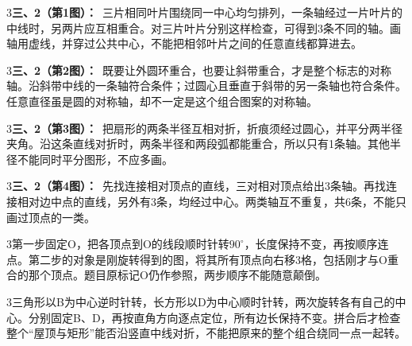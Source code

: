 \documentclass[multi=snippet,border={5bp 20bp 5bp 5bp}]{standalone}
\newenvironment{snippet}[3]{\begin{minipage}{#1bp}\color{answerred}\fontsize{#2}{#3}\selectfont\raggedright}{\end{minipage}}
\begin{document}
\begin{snippet}{505}{11.5}{14}\begin{multicols}{3}\raggedcolumns \textbf{三、2（第1图）：}\ 三片相同叶片围绕同一中心均匀排列，一条轴经过一片叶片的中线时，另两片应互相重合。对三片叶片分别这样检查，可得到3条不同的轴。画轴用虚线，并穿过公共中心，不能把相邻叶片之间的任意直线都算进去。\end{multicols}\end{snippet}
\begin{snippet}{505}{11.5}{14}\begin{multicols}{3}\raggedcolumns \textbf{三、2（第2图）：}\ 既要让外圆环重合，也要让斜带重合，才是整个标志的对称轴。沿斜带中线的一条轴符合条件；过圆心且垂直于斜带的另一条轴也符合条件。任意直径虽是圆的对称轴，却不一定是这个组合图案的对称轴。\end{multicols}\end{snippet}
\begin{snippet}{505}{11.5}{14}\begin{multicols}{3}\raggedcolumns \textbf{三、2（第3图）：}\ 把扇形的两条半径互相对折，折痕须经过圆心，并平分两半径夹角。沿这条直线对折时，两条半径和两段弧都能重合，所以只有1条轴。其他半径不能同时平分图形，不应多画。\end{multicols}\end{snippet}
\begin{snippet}{505}{11.5}{14}\begin{multicols}{3}\raggedcolumns \textbf{三、2（第4图）：}\ 先找连接相对顶点的直线，三对相对顶点给出3条轴。再找连接相对边中点的直线，另外有3条，均经过中心。两类轴互不重复，共6条，不能只画过顶点的一类。\end{multicols}\end{snippet}
\begin{snippet}{505}{11.5}{14}\begin{multicols}{3}\raggedcolumns 第一步固定O，把各顶点到O的线段顺时针转\(90^\circ\)\allowbreak ，长度保持不变，再按顺序连点。第二步的对象是刚旋转得到的图，将其所有顶点向右移3格，包括刚才与O重合的那个顶点。题目原标记O仍作参照，两步顺序不能随意颠倒。\end{multicols}\end{snippet}
\begin{snippet}{505}{11.5}{14}\begin{multicols}{3}\raggedcolumns 三角形以B为中心逆时针转，长方形以D为中心顺时针转，两次旋转各有自己的中心。分别固定B、D，再按直角方向逐点定位，所有边长保持不变。拼合后才检查整个“屋顶与矩形”能否沿竖直中线对折，不能把原来的整个组合绕同一点一起转。\end{multicols}\end{snippet}
\end{document}
